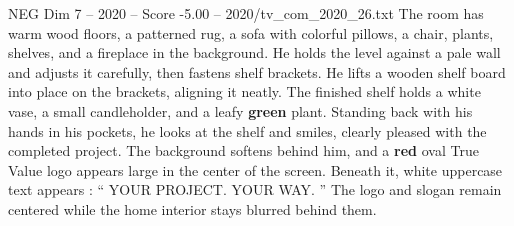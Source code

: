 \begin{textsample}{NEG Dim 7 – 2020 – Score -5.00 – 2020/tv\_com\_2020\_26.txt}
The room has warm wood floors, a patterned rug, a sofa with colorful pillows, a chair, plants, shelves, and a fireplace in the background.
He holds the level against a pale wall and adjusts it carefully, then fastens shelf brackets.
He lifts a wooden shelf board into place on the brackets, aligning it neatly.
The finished shelf holds a white vase, a small candleholder, and a leafy \textbf{green} plant.
Standing back with his hands in his pockets, he looks at the shelf and smiles, clearly pleased with the completed project.
The background softens behind him, and a \textbf{red} oval True Value logo appears large in the center of the screen.
Beneath it, white uppercase text appears : “ YOUR PROJECT.
YOUR WAY. ” The logo and slogan remain centered while the home interior stays blurred behind them.

\end{textsample}
